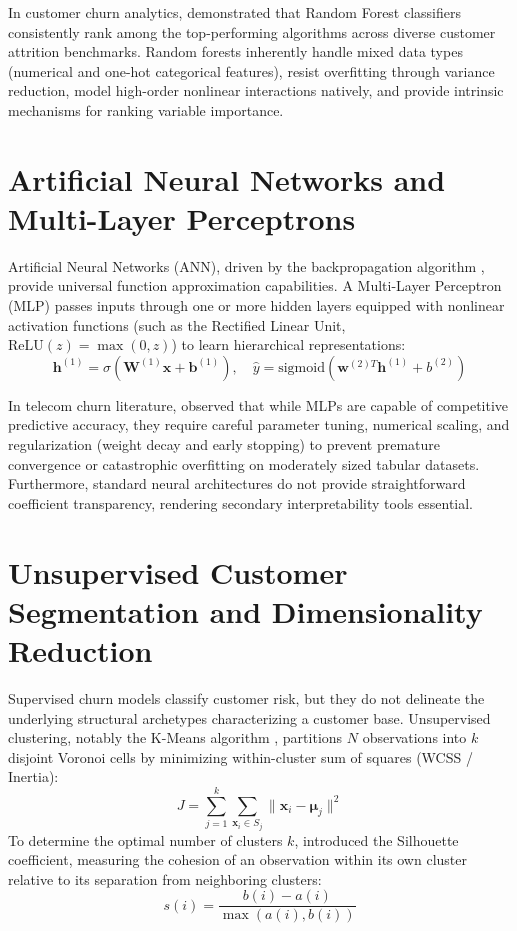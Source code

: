 In customer churn analytics, \citet{verbeke2012building} demonstrated that Random Forest classifiers consistently rank among the top-performing algorithms across diverse customer attrition benchmarks. Random forests inherently handle mixed data types (numerical and one-hot categorical features), resist overfitting through variance reduction, model high-order nonlinear interactions natively, and provide intrinsic mechanisms for ranking variable importance.

\section{Artificial Neural Networks and Multi-Layer Perceptrons}
Artificial Neural Networks (ANN), driven by the backpropagation algorithm \citep{rumelhart1986learning}, provide universal function approximation capabilities. A Multi-Layer Perceptron (MLP) passes inputs through one or more hidden layers equipped with nonlinear activation functions (such as the Rectified Linear Unit, $\text{ReLU}(z) = \max(0, z)$) to learn hierarchical representations:
\begin{equation}
    \mathbf{h}^{(1)} = \sigma(\mathbf{W}^{(1)} \mathbf{x} + \mathbf{b}^{(1)}), \quad \hat{y} = \text{sigmoid}(\mathbf{w}^{(2)T} \mathbf{h}^{(1)} + b^{(2)})
\end{equation}

In telecom churn literature, \citet{vafeiadis2015comparison} observed that while MLPs are capable of competitive predictive accuracy, they require careful parameter tuning, numerical scaling, and regularization (weight decay and early stopping) to prevent premature convergence or catastrophic overfitting on moderately sized tabular datasets. Furthermore, standard neural architectures do not provide straightforward coefficient transparency, rendering secondary interpretability tools essential.

\section{Unsupervised Customer Segmentation and Dimensionality Reduction}
Supervised churn models classify customer risk, but they do not delineate the underlying structural archetypes characterizing a customer base. Unsupervised clustering, notably the K-Means algorithm \citep{macqueen1967some}, partitions $N$ observations into $k$ disjoint Voronoi cells by minimizing within-cluster sum of squares (WCSS / Inertia):
\begin{equation}
    J = \sum_{j=1}^k \sum_{\mathbf{x}_i \in S_j} \|\mathbf{x}_i - \boldsymbol{\mu}_j\|^2
\end{equation}
To determine the optimal number of clusters $k$, \citet{rousseeuw1987silhouettes} introduced the Silhouette coefficient, measuring the cohesion of an observation within its own cluster relative to its separation from neighboring clusters:
\begin{equation}
    s(i) = \frac{b(i) - a(i)}{\max(a(i), b(i))}
\end{equation}

